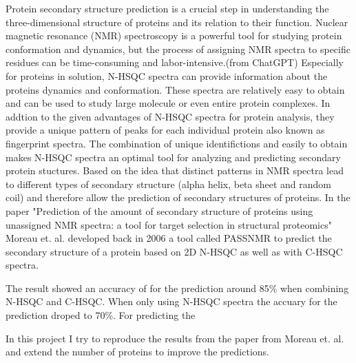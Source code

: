 \documentclass[11pt]{article}
\author{Jonas Dietrich}
\date{\today}
\title{}
\begin{document}
\tableofcontents

Protein secondary structure prediction is a crucial step in understanding the three-dimensional structure of proteins and its relation to their function. Nuclear magnetic resonance (NMR) spectroscopy is a powerful tool for studying protein conformation and dynamics, but the process of assigning NMR spectra to specific residues can be time-consuming and labor-intensive.(from ChatGPT)
Especially for proteins in solution, N-HSQC spectra can provide information about the proteins dynamics and conformation. These spectra are relatively easy to obtain and can be used to study large molecule or even entire protein complexes. In addtion to the given advantages of N-HSQC spectra for protein analysis, they provide a unique pattern of peaks for each individual protein also known as fingerprint spectra.
The combination of unique identifictions and easily to obtain makes N-HSQC spectra an optimal tool for analyzing and predicting secondary protein stuctures.
Based on the idea that distinct patterns in NMR spectra lead to different types of secondary structure (alpha helix, beta sheet and random coil) and therefore allow the prediction of secondary structures of proteins.
In the paper "Prediction of the amount of secondary structure of proteins using unassigned NMR spectra: a tool for target selection in structural proteomics" Moreau et. al. developed back in 2006 a tool called PASSNMR to predict the secondary structure of a protein based on 2D N-HSQC as well as with C-HSQC spectra.



The result showed an accuracy of for the prediction around 85\% when combining N-HSQC and C-HSQC. When only using N-HSQC spectra the accuary for the prediction droped to 70\%.
For predicting the


In this project I try to reproduce the results from the paper from Moreau et. al. and extend the number of proteins to improve the predictions.
\end{document}

